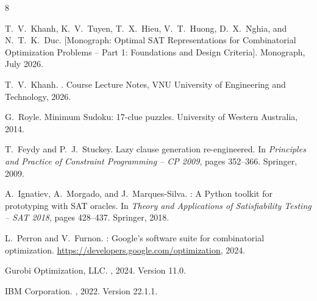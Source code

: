 \documentclass[a4paper,fleqn]{cas-sc}
\begin{document}
\clearpage
\begin{thebibliography}{8}

T.~V.~Khanh, K.~V.~Tuyen, T.~X.~Hieu, V.~T.~Huong, D.~X.~Nghia, and N.~T.~K.~Duc.
 [Monograph: Optimal SAT Representations for Combinatorial Optimization Problems -- Part 1: Foundations and Design Criteria].
\newblock Monograph, July 2026.

T.~V.~Khanh.
.
\newblock Course Lecture Notes, VNU University of Engineering and Technology, 2026.

G.~Royle.
\newblock Minimum Sudoku: 17-clue puzzles.
\newblock University of Western Australia, 2014.

T.~Feydy and P.~J.~Stuckey.
\newblock Lazy clause generation re-engineered.
\newblock In {\em Principles and Practice of Constraint Programming -- CP 2009}, pages 352--366. Springer, 2009.

A.~Ignatiev, A.~Morgado, and J.~Marques-Silva.
: A {Python} toolkit for prototyping with {SAT} oracles.
\newblock In {\em Theory and Applications of Satisfiability Testing -- SAT 2018}, pages 428--437. Springer, 2018.

L.~Perron and V.~Furnon.
: Google's software suite for combinatorial optimization.
\newblock \url{https://developers.google.com/optimization}, 2024.

Gurobi Optimization, LLC.
, 2024.
\newblock Version 11.0.

IBM Corporation.
, 2022.
\newblock Version 22.1.1.

\end{thebibliography}
\end{document}
